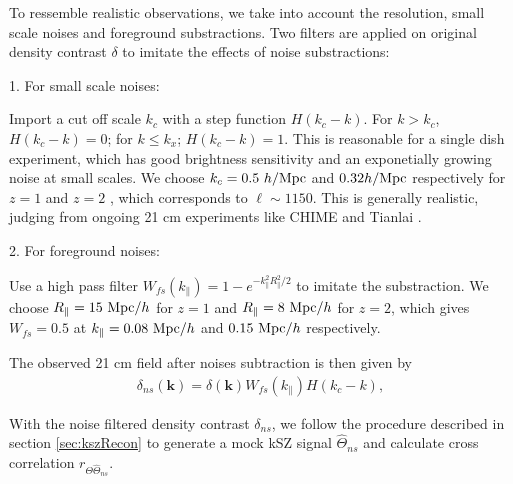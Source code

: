 To ressemble realistic observations, we take into account the resolution, small scale noises and foreground substractions. 
Two filters are applied on original density contrast $\delta$ to imitate the effects of noise substractions:

1. For small scale noises:

Import a cut off scale $k_c$ 
with a step function $H(k_c-k)$. 
For $k>k_c$, $H(k_c-k)=0$; for $k\leqslant k_x$; $H(k_c-k)=1$.
This is reasonable for a single dish experiment, which
has good brightness sensitivity and an exponetially growing noise at small 
scales.
We choose $k_c=0.5\ h/\mathrm{Mpc}$ and $0.32 h/\mathrm{Mpc}$ respectively for $z=1$ and $z=2$ , which corresponds
to $\ell\sim1150$. 
This is generally realistic, judging from ongoing 21 cm experiments like
CHIME \cite{2014SPIE.9145E..22B}\cite{2014SPIE.9145E..4VN}
and Tianlai \cite{2012IJMPS..12..256C}\cite{2015ApJ...798...40X}.

2. For foreground noises:

Use a high pass filter $W_{fs}(k_\parallel)=1-e^{-k_\parallel^2R_\parallel^2/2}$ to imitate the substraction. 
We choose 
$R_\parallel=15\ \mathrm{Mpc}/h$ for $z=1$ and $R_\parallel=8\ \mathrm{Mpc}/h$ for $z=2$, which gives
$W_{fs}=0.5$ at
$k_\parallel=0.08\ \mathrm{Mpc}/h$ and $0.15\ \mathrm{Mpc}/h$ respectively. 

The observed 21 cm field after noises subtraction is then given by 
\begin{eqnarray}
\label{eq:ns}
\delta_{ns}(\bm{k})=\delta(\bm{k})W_{fs}(k_\parallel)H(k_c-k),
\end{eqnarray}

With the noise filtered density contrast $\delta_{ns}$, we follow the procedure described in 
section \ref{sec:kszRecon} to generate a mock kSZ signal $\hat \Theta_{ns}$  
and calculate cross correlation $r_{\Theta\hat\Theta_{ns}}$.
